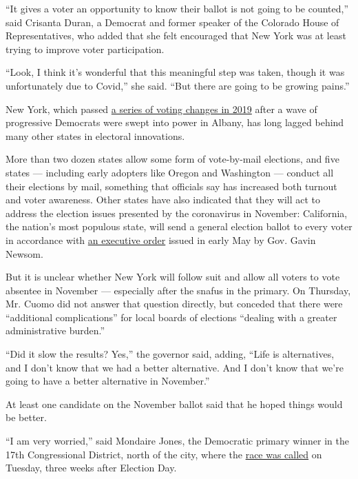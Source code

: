 ``It gives a voter an opportunity to know their ballot is not going to
be counted,'' said Crisanta Duran, a Democrat and former speaker of the
Colorado House of Representatives, who added that she felt encouraged
that New York was at least trying to improve voter participation.

``Look, I think it's wonderful that this meaningful step was taken,
though it was unfortunately due to Covid,'' she said. ``But there are
going to be growing pains.''

New York, which passed
\href{https://www.nytimes.com/2019/01/10/nyregion/voting-reform-election-ny.html}{a
series of voting changes in 2019} after a wave of progressive Democrats
were swept into power in Albany, has long lagged behind many other
states in electoral innovations.

More than two dozen states allow some form of vote-by-mail elections,
and five states --- including early adopters like Oregon and Washington
--- conduct all their elections by mail, something that officials say
has increased both turnout and voter awareness. Other states have also
indicated that they will act to address the election issues presented by
the coronavirus in November: California, the nation's most populous
state, will send a general election ballot to every voter in accordance
with
\href{https://www.gov.ca.gov/wp-content/uploads/2020/05/05.08.2020-EO-N-64-20-signed.pdf}{an
executive order} issued in early May by Gov. Gavin Newsom.

But it is unclear whether New York will follow suit and allow all voters
to vote absentee in November --- especially after the snafus in the
primary. On Thursday, Mr. Cuomo did not answer that question directly,
but conceded that there were ``additional complications'' for local
boards of elections ``dealing with a greater administrative burden.''

``Did it slow the results? Yes,'' the governor said, adding, ``Life is
alternatives, and I don't know that we had a better alternative. And I
don't know that we're going to have a better alternative in November.''

At least one candidate on the November ballot said that he hoped things
would be better.

``I am very worried,'' said Mondaire Jones, the Democratic primary
winner in the 17th Congressional District, north of the city, where the
\href{https://www.nytimes.com/2020/07/14/nyregion/mondaire-jones-house-primary.html}{race
was called} on Tuesday, three weeks after Election Day.

